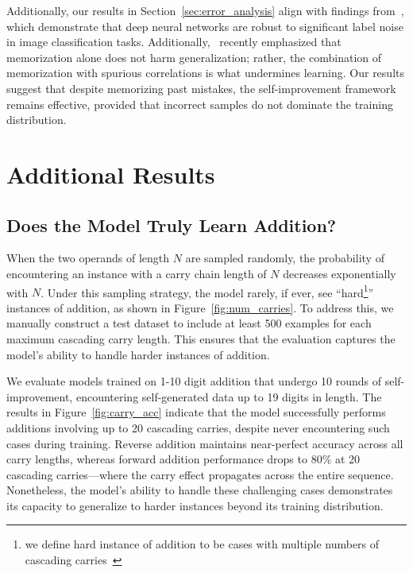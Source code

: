 Additionally, our results in Section~\ref{sec:error_analysis} align with findings from~\citet{rolnick2017deep}, which demonstrate that deep neural networks are robust to significant label noise in image classification tasks. Additionally,~\citet{Bayat2024ThePO} recently emphasized that memorization alone does not harm generalization; rather, the combination of memorization with spurious correlations is what undermines learning. Our results suggest that despite memorizing past mistakes, the self-improvement framework remains effective, provided that incorrect samples do not dominate the training distribution.










\newpage
\section{Additional Results}\label{sec:additional_results}


\subsection{Does the Model Truly Learn Addition?}
When the two operands of length $N$ are sampled randomly, the probability of encountering an instance with a carry chain length of $N$ decreases exponentially with $N$. Under this sampling strategy, the model rarely, if ever, see ``hard\footnote{we define hard instance of addition to be cases with multiple numbers of cascading carries~\citep{quirke2023understanding}}'' instances of addition, as shown in Figure~\ref{fig:num_carries}. To address this, we manually construct a test dataset to include at least 500 examples for each maximum cascading carry length. This ensures that the evaluation captures the model's ability to handle harder instances of addition.

We evaluate models trained on 1-10 digit addition that undergo 10 rounds of self-improvement, encountering self-generated data up to 19 digits in length. The results in Figure~\ref{fig:carry_acc} indicate that the model successfully performs additions involving up to 20 cascading carries, despite never encountering such cases during training. Reverse addition maintains near-perfect accuracy across all carry lengths, whereas forward addition performance drops to 80\% at 20 cascading carries—where the carry effect propagates across the entire sequence. Nonetheless, the model's ability to handle these challenging cases demonstrates its capacity to generalize to harder instances beyond its training distribution.

